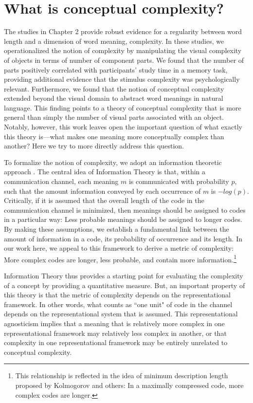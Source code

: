 
\chapter{What is conceptual complexity?}
\label{chapter:complexity}

The studies in Chapter 2 provide robust evidence for a regularity between word length and a dimension of word meaning, complexity. In these studies, we operationalized the notion of complexity by manipulating the visual complexity of objects in terms of number of component parts. We found that the number of parts  positively correlated with participants' study time in a memory task, providing additional evidence that the stimulus complexity was psychologically relevant. Furthermore, we found that the notion of conceptual complexity extended beyond the visual domain to abstract word meanings in natural language. This finding points to a theory of conceptual complexity that is more general than simply the number of visual parts associated with an object.  Notably, however, this work leaves open the important question of what exactly this theory is---what makes one meaning more conceptually complex than another? Here we try to more directly address this question. 

To formalize the notion of complexity, we adopt an information theoretic approach \cite{shannon1948}. The central idea of Information Theory is that, within a communication channel, each meaning $m$ is communicated with probability $p$, such that the amount information conveyed by each occurrence of $m$ is $-log(p)$. Critically, if it is assumed that the overall length of the code in the communication channel is minimized, then meanings should be assigned to codes in a particular way: Less probable meanings should be assigned to longer codes. By making these assumptions, we establish a fundamental link between the amount of information in a code, its probability of occurrence and its length. In our work here, we appeal to this framework to derive a metric of complexity: More complex codes are longer, less probable, and contain more information.\footnote{This relationship is reflected in the idea of minimum description length proposed by Kolmogorov and others: In a maximally compressed code, more complex codes are longer.} 

Information Theory thus provides a  starting point for evaluating the complexity of a concept by providing a quantitative measure. But, an important property of this theory is that the metric of complexity depends on the representational framework. In other words, what counts as ``one unit" of code in the  channel depends on the representational system that is assumed. This representational agnosticism implies that a meaning that is relatively more complex in one representational framework may relatively less complex in another, or that  complexity in one representational framework may be entirely unrelated to conceptual complexity.


